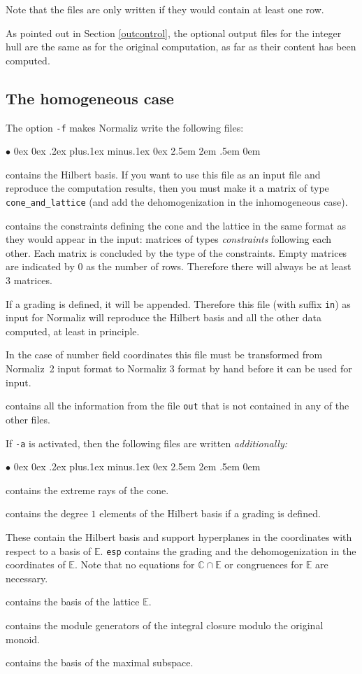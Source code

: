\documentclass[12pt,a4paper]{scrartcl}
\newcommand{\stdli}{ \topsep0ex \partopsep0ex %
\parsep.2ex plus.1ex minus.1ex \itemsep0ex%
\leftmargin2.5em \labelwidth2em \labelsep.5em \rightmargin0em}%
\renewenvironment{itemize}{\begin{list}{{$\bullet$}}{\stdli}}{\end{list}}
\theoremstyle{definition}
\def\CC{{\mathbb C}}
\def\EE{{\mathbb E}}
\def\itemtt[#1]{\item[\textbf{\ttt{#1}}]}
\def\ttt{\texttt}
\begin{document}
Note that the files are only written if they would contain at least one row.

As pointed out in Section \ref{outcontrol}, the optional output files for the integer hull are the same as for the original computation, as far as their content has been computed.

\subsection{The homogeneous case}

The option \ttt{-f} makes Normaliz write the following files:

\begin{itemize}
\itemtt[gen] contains the Hilbert basis. If you want to use this file as an input file and reproduce the computation results, then you must make it a matrix of type \verb|cone_and_lattice| (and add the dehomogenization in the inhomogeneous case).

\itemtt[cst] contains the constraints defining the cone
and the lattice in the same format as they would appear
in the input: matrices of types \emph{constraints} following each
other. Each matrix is concluded by the type of the constraints.
Empty matrices are indicated by $0$ as the
number of rows. Therefore there will always be at least
$3$ matrices.

If a grading is defined, it will be appended. Therefore
this file (with suffix \ttt{in}) as input for
Normaliz will reproduce the Hilbert basis and all the
other data computed, at least in principle.

In the case of number field coordinates this file must be transformed from Normaliz~2 input format to Normaliz 3 format by hand before it can be used for input.

\itemtt[inv]  contains all the information from the
file \ttt{out} that is not contained in any of the
other files.
\end{itemize}

If \ttt{-a} is activated, then the following files are written
\emph{additionally:}

\begin{itemize}

\itemtt[ext] contains the extreme rays of the cone.

\itemtt[ht1] contains the degree $1$ elements of the
Hilbert basis if a grading is defined.

\itemtt[egn,esp] These contain the Hilbert basis and
support hyperplanes in the coordinates with respect to
a basis of $\EE$. \ttt{esp} contains the grading and the dehomogenization in the
coordinates of $\EE$. Note that no
equations for $\CC\cap\EE$ or congruences for $\EE$ are
necessary.

\itemtt[lat] contains the basis of the lattice $\EE$.

\itemtt[mod] contains the module generators of the integral closure modulo the original monoid.

\itemtt[msp] contains the basis of the maximal subspace.
\end{itemize}
\end{document}
